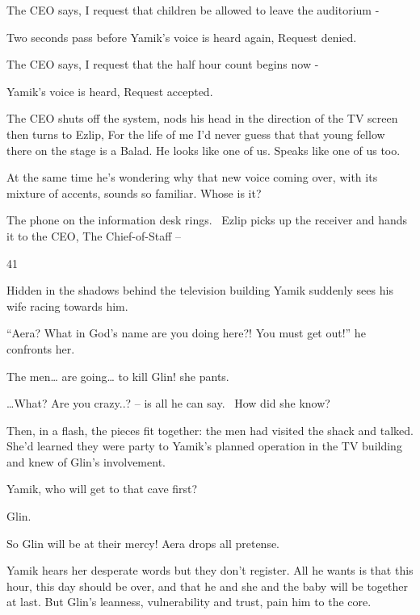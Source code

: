 \documentclass[letterpaper]{article}
\begin{document}
The CEO says, {\textquotedbl}I request that children be allowed to leave the auditorium -{\textquotedbl}

Two seconds pass before Yamik's voice is heard again, {\textquotedbl}Request denied.{\textquotedbl}

The CEO says, {\textquotedbl}I request that the half hour count begins now -{\textquotedbl}

Yamik's voice is heard, {\textquotedbl}Request accepted.{\textquotedbl}

The CEO shuts off the system, nods his head in the direction of the TV screen then turns
to\textcolor[rgb]{0.0,0.4392157,0.7529412}{ }Ezlip, {\textquotedbl}For the life of me I'd never guess that that young
fellow there on the stage is a Balad. He looks like one of us. Speaks like one of us too.{\textquotedbl}

At the same time he's wondering why that new voice coming over,\textcolor[rgb]{0.0,0.4392157,0.7529412}{ }with its
mixture of accents, sounds so familiar. Whose\textcolor{red}{ }is it?

The phone on the information desk rings. \ Ezlip picks up the receiver and hands it to the CEO, {\textquotedbl}The
Chief-of-Staff --{\textquotedbl}


\bigskip

41 

Hidden in the shadows behind the television building Yamik suddenly sees his wife racing towards him. 

{}``Aera? What in God's name are you doing here?! You must get out!'' he confronts her. 

{\textquotedbl}The men{\dots} are going{\dots} to kill Glin!{\textquotedbl} she pants.

\textcolor[rgb]{0.0,0.4392157,0.7529412}{{\dots}}{\textquotedbl}What?\textcolor[rgb]{0.0,0.4392157,0.7529412}{ }Are you
crazy..?{\textquotedbl} -- is all he can say. \ How did she know? 

Then, in a flash, the pieces fit together: the men had visited the shack and talked. She'd learned they were party to
Yamik's planned operation in the TV building and knew of Glin's involvement.

{\textquotedbl}Yamik, who will get to that cave first?{\textquotedbl} 

{\textquotedbl}Glin.{\textquotedbl} 

{\textquotedbl}So Glin will be at their mercy!{\textquotedbl} Aera drops all pretense. 

Yamik hears her desperate words but they don't register. All he wants is that this hour, this day should be over, and
that he and she and the baby will be together at last. But Glin's leanness, vulnerability and trust, pain him to the
core\textcolor[rgb]{0.0,0.4392157,0.7529412}{.}
\end{document}
